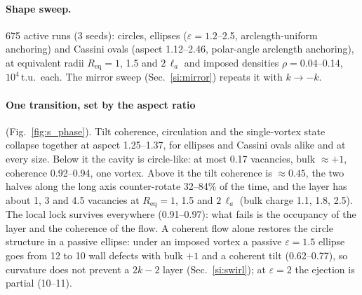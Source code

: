 \documentclass[aps,prl,onecolumn,superscriptaddress,amsmath,amssymb,nofootinbib]{revtex4-2}
\newcommand{\la}{\ell_a}
\begin{document}
\paragraph{Shape sweep.} 675 active runs (3 seeds): circles, ellipses ($\varepsilon=1.2$--2.5, arclength-uniform anchoring) and Cassini ovals (aspect 1.12--2.46, polar-angle
arclength anchoring), at equivalent radii $R_\mathrm{eq}=1$, 1.5 and $2\,\la$ and imposed densities $\rho=0.04$--0.14, $10^4$\,t.u.\ each. The mirror sweep (Sec.~\ref{si:mirror})
repeats it with $k\to-k$.

\paragraph{One transition, set by the aspect ratio} (Fig.~\ref{fig:s_phase}). Tilt coherence, circulation and the single-vortex state collapse together at aspect 1.25--1.37,
for ellipses and Cassini ovals alike and at every size. Below it the cavity is circle-like: at most 0.17 vacancies, bulk $\approx+1$, coherence 0.92--0.94, one vortex. Above it
the tilt coherence is $\approx0.45$, the two halves along the long axis counter-rotate 32--84\% of the time, and the layer has about 1, 3 and 4.5 vacancies at
$R_\mathrm{eq}=1$, 1.5 and $2\,\la$ (bulk charge 1.1, 1.8, 2.5). The local lock survives everywhere (0.91--0.97): what fails is the occupancy of the layer and the coherence of the
flow. A coherent flow alone restores the circle structure in a passive ellipse: under an imposed vortex a passive $\varepsilon=1.5$ ellipse goes from 12 to 10 wall defects with bulk
$+1$ and a coherent tilt (0.62--0.77), so curvature does not prevent a $2k-2$ layer (Sec.~\ref{si:swirl}); at $\varepsilon=2$ the ejection is partial (10--11).
\end{document}
